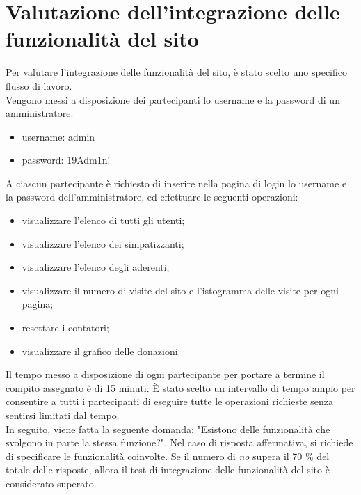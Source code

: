 \documentclass{article}
\begin{document}
\section{Valutazione dell'integrazione delle funzionalità del sito}
Per valutare l'integrazione delle funzionalità del sito, è stato scelto uno specifico flusso di lavoro.\\
Vengono messi a disposizione dei partecipanti lo username e la password di un amministratore:
\begin{itemize}
     \item username: admin
    \item password: 19Adm1n!
\end{itemize}
A ciascun partecipante è richiesto di inserire nella pagina di login lo username e la password dell'amministratore, ed effettuare le seguenti operazioni:
\begin{itemize}
    \item visualizzare l'elenco di tutti gli utenti;
    \item visualizzare l'elenco dei simpatizzanti;
    \item visualizzare l'elenco degli aderenti;
    \item visualizzare il numero di visite del sito e l'istogramma delle visite per ogni pagina;
    \item resettare i contatori;
    \item visualizzare il grafico delle donazioni.
\end{itemize}
Il tempo messo a disposizione di ogni partecipante per portare a termine il compito assegnato è di 15 minuti. È stato scelto un intervallo di tempo ampio per consentire a tutti i partecipanti di eseguire tutte le operazioni richieste senza sentirsi limitati dal tempo.\\
In seguito, viene fatta la seguente domanda: "Esistono delle funzionalità che svolgono in parte la stessa funzione?". Nel caso di risposta affermativa, si richiede di specificare le funzionalità coinvolte. Se il numero di \textit{no} supera il 70 \% del totale delle risposte, allora il test di integrazione delle funzionalità del sito è considerato superato.

\vspace{0.7cm}
\end{document}
